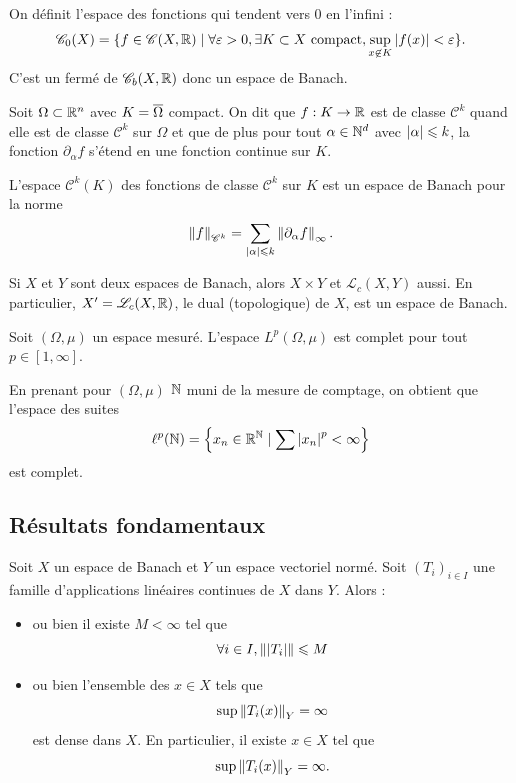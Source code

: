 \documentclass[twocolumn, landscape]{article}
\begin{document}
\begin{exem}
    On définit l'espace des fonctions qui tendent vers 0 en l'infini :
    $$\mathscr{C}_0(X) = \{f\in \mathscr{C}(X, \mathbb{R}) \mid \forall \varepsilon > 0, \exists K \subset X \text{ compact}, \sup_{x \not \in K} \left\lvert f(x) \right\rvert < \varepsilon\}.$$
    C'est un fermé de $\mathscr{C}_b(X, \mathbb{R})$ donc un espace de Banach.  
\end{exem}

\begin{exem}
    Soit $\Omega \subset \mathbb{R}^n$ avec $K = \overline{\Omega}$ compact. On dit que $f:K \to \mathbb{R}$ est de classe $\mathscr{C}^k$ quand elle est de classe $\mathscr{C}^k$ sur $\Omega$ et que de plus pour tout $\alpha \in \mathbb{N}^d$ avec $\left\lvert \alpha \right\rvert \leqslant k$, la fonction $\partial_\alpha f$ s'étend en une fonction continue sur $K$.

    L'espace $\mathscr{C}^k(K)$ des fonctions de classe $\mathscr{C}^k$ sur $K$ est un espace de Banach pour la norme $$\left\lVert f \right\rVert_{\mathscr{C}^k} = \sum_{\left\lvert \alpha \right\rvert \leqslant k} \left\lVert \partial_\alpha f \right\rVert_{\infty}.$$
\end{exem}

\begin{prop}
    Si $X$ et $Y$ sont deux espaces de Banach, alors $X\times Y$ et $\mathscr{L}_c(X, Y)$ aussi. En particulier, $X' = \mathscr{L}_c(X, \mathbb{R})$, le dual (topologique) de $X$, est un espace de Banach.
\end{prop}

\begin{theo}
    Soit $(\Omega, \mu)$ un espace mesuré. L'espace $L^p(\Omega, \mu)$ est complet pour tout $p \in [1, \infty]$.
\end{theo}

\begin{exem}
    En prenant pour $(\Omega, \mu)$ $\mathbb{N}$ muni de la mesure de comptage, on obtient que l'espace des suites
    $$\ell^p(\mathbb{N}) = \left\{ x_n \in \mathbb{R}^{\mathbb{N}} \mid \sum \left\lvert x_n \right\rvert^p < \infty \right\}$$
    est complet. 
\end{exem}

\subsection{Résultats fondamentaux \cite{Li}}

\begin{theo}
    Soit $X$ un espace de Banach et $Y$ un espace vectoriel normé. Soit $(T_i)_{i\in I}$ une famille d'applications linéaires continues de $X$ dans $Y$. Alors :
    \begin{itemize}
        \item ou bien il existe $M < \infty$ tel que $$\forall i \in I, \left\lVert \left\lvert T_i \right\rvert \right\rVert \leqslant M$$
        \item ou bien l'ensemble des $x\in X$ tels que $$\sup \left\lVert T_i(x) \right\rVert_Y = \infty$$
        est dense dans $X$. En particulier, il existe $x\in X$ tel que $$\sup \left\lVert T_i(x) \right\rVert_Y = \infty.$$
    \end{itemize}
\end{theo}
\end{document}
